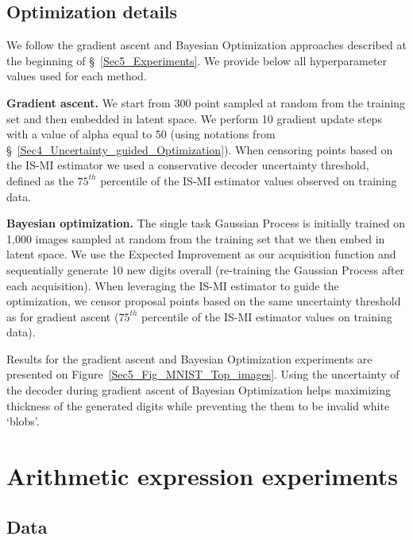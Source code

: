 \subsection{Optimization details}
\label{Appendix_B.4_Digit_generation_Optimization}

We follow the gradient ascent and Bayesian Optimization approaches described at the beginning of \S~\ref{Sec5_Experiments}. We provide below all hyperparameter values used for each method.

\textbf{Gradient ascent.} We start from 300 point sampled at random from the training set and then embedded in latent space. We perform 10 gradient update steps with a value of alpha equal to 50 (using notations from \S~\ref{Sec4_Uncertainty_guided_Optimization}). When censoring points based on the IS-MI estimator we used a conservative decoder uncertainty threshold, defined as the $75^{th}$ percentile of the IS-MI estimator values observed on training data.

\textbf{Bayesian optimization.} The single task Gaussian Process is initially trained on 1,000 images sampled at random from the training set that we then embed in latent space. We use the Expected Improvement as our acquisition function and sequentially generate 10 new digits overall (re-training the Gaussian Process after each acquisition). When leveraging the IS-MI estimator to guide the optimization, we censor proposal points based on the same uncertainty threshold as for gradient ascent ($75^{th}$ percentile of the IS-MI estimator values on training data). 

Results for the gradient ascent and Bayesian Optimization experiments are presented on Figure~\ref{Sec5_Fig_MNIST_Top_images}. Using the uncertainty of the decoder during gradient ascent of Bayesian Optimization helps maximizing thickness of the generated digits while preventing the them to be invalid white `blobs'.

\section{Arithmetic expression experiments}
\label{Appendix_C_Arithmetic_expression}

\subsection{Data}
\label{Appendix_C.1_Arithmetic_expression_Data}

